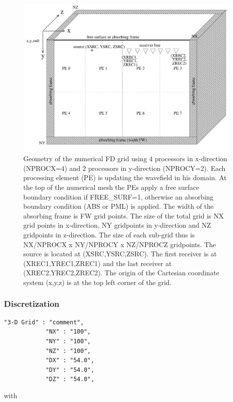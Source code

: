 \documentclass[11pt,onecolumn,oneside]{article}
\begin{document}
\begin{figure}
\begin{center}
\includegraphics[width=\textwidth,angle=0]{eps/grid.pdf}
\end{center}
\caption{Geometry of the numerical FD grid using 4 processors in x-direction (NPROCX=4) and 2 processors in y-direction (NPROCY=2). Each processing element (PE) is updating the wavefield in his domain.
At the top of the numerical mesh the PEs apply a free surface boundary condition if FREE\_SURF=1, otherwise an absorbing boundary condition (ABS or PML) is applied. The width of the absorbing frame is FW grid points.  The size of the total grid is NX grid points in x-direction, NY gridpoints in y-direction and NZ gridpoints in z-direction. The size of each sub-grid  thus is NX/NPROCX x NY/NPROCY x NZ/NPROCZ gridpoints. The source is located at (XSRC,YSRC,ZSRC). The first receiver is at (XREC1,YREC1,ZREC1) and the  last receiver at (XREC2,YREC2,ZREC2). The origin of the Cartesian coordinate system (x,y,z) is at the top left corner of the grid. }
\label{fig_grid}
\end{figure}
\subsubsection{Discretization}
\begin{verbatim}
"3-D Grid" : "comment",
            "NX" : "100",
            "NY" : "100",
            "NZ" : "100",
            "DX" : "54.0",
            "DY" : "54.0",
            "DZ" : "54.0",
\end{verbatim}

with
\end{document}
